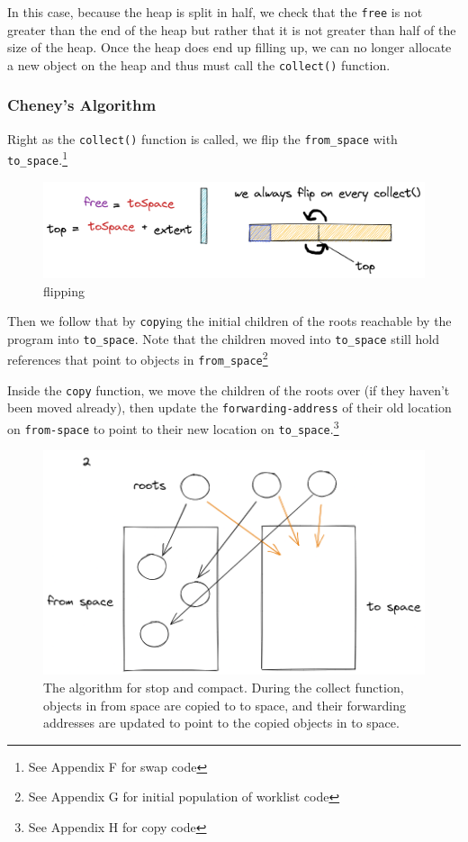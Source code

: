 \documentclass[index]{subfiles}
\begin{document}
In this case, because the heap is split in half, we check that the \verb+free+ is not greater than the end of the heap but rather that it is not greater than half of the size of the heap. Once the heap does end up filling up, we can no longer allocate a new object on the heap and thus must call the \verb+collect()+ function.

\subsubsection{Cheney's Algorithm}

Right as the \verb+collect()+ function is called, we flip the \verb+from_space+ with \verb+to_space+.\footnote{See Appendix F for swap code}

\begin{figure}[H]
    \centering
    \includegraphics[scale=0.25]{pics/flipping.png}
    \caption{flipping}
\end{figure}

Then we follow that by \verb+copy+ing the initial children of the roots reachable by the program into \verb+to_space+. Note that the children moved into \verb+to_space+ still hold references that point to objects in \verb+from_space+\footnote{See Appendix G for initial population of worklist code}

Inside the \verb+copy+ function, we move the children of the roots over (if they haven't been moved already), then update the \verb+forwarding-address+ of their old location on \verb+from-space+ to point to their new location on \verb+to_space+.\footnote{See Appendix H for copy code}

\begin{figure}[H]
    \centering
    \includegraphics[scale=0.3]{pics/visualization-of-worklist.png}
    \caption{The algorithm for stop and compact. During the collect function, objects in from space are copied to to space, and their forwarding addresses are updated to point to the copied objects in to space.}
\end{figure}
\end{document}
